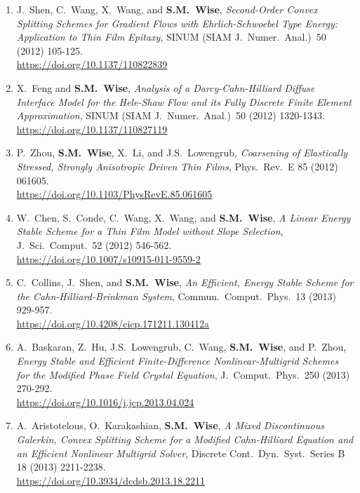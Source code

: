 \documentclass[10pt,letterpaper]{article}
\begin{document}
\begin{enumerate}
	\item
J.~Shen, C.~Wang, X.~Wang, and \textbf{S.M.~Wise}, {\sl Second-Order Convex Splitting Schemes for Gradient Flows with Ehrlich-Schwoebel Type Energy: Application to Thin Film Epitaxy}, SINUM (SIAM J.~Numer.~Anal.)~50 (2012) 105-125.
	\\
\url{https://doi.org/10.1137/110822839}
    
    \item
X.~Feng and \textbf{S.M.~Wise}, {\sl Analysis of a Darcy-Cahn-Hilliard Diffuse Interface Model for the Hele-Shaw Flow and its Fully Discrete Finite Element Approximation}, SINUM (SIAM J.~Numer.~Anal.)~50 (2012) 1320-1343.
	\\
\url{https://doi.org/10.1137/110827119}

    \item
P.~Zhou, \textbf{S.M.~Wise}, X.~Li, and J.S.~Lowengrub, {\sl Coarsening of Elastically Stressed, Strongly Anisotropic Driven Thin Films}, Phys.~Rev.~E 85 (2012) 061605.
	\\
\url{https://doi.org/10.1103/PhysRevE.85.061605}

	\item
W.~Chen, S.~Conde, C.~Wang, X.~Wang, and \textbf{S.M.~Wise}, {\sl A Linear Energy Stable Scheme for a Thin Film Model without Slope Selection}, J.~Sci.~Comput.~52 (2012) 546-562.
	\\
\url{https://doi.org/10.1007/s10915-011-9559-2}

    \item
C.~Collins, J.~Shen, and \textbf{S.M.~Wise}, {\sl An Efficient, Energy Stable Scheme for the Cahn-Hilliard-Brinkman System}, Commun.~Comput.~Phys.~13 (2013) 929-957.
	\\
\url{https://doi.org/10.4208/cicp.171211.130412a}

    \item
A.~Baskaran, Z.~Hu, J.S.~Lowengrub, C.~Wang, \textbf{S.M.~Wise}, and P.~Zhou, {\sl Energy Stable and Efficient Finite-Difference Nonlinear-Multigrid Schemes for the Modified Phase Field Crystal Equation}, J.~Comput.~Phys.~250 (2013) 270-292.
	\\
\url{https://doi.org/10.1016/j.jcp.2013.04.024}

	\item
A.~Aristotelous, O.~Karakashian, \textbf{S.M.~Wise}, {\sl A Mixed Discontinuous Galerkin, Convex Splitting Scheme for a Modified Cahn-Hilliard Equation and an Efficient Nonlinear Multigrid Solver}, Discrete Cont.~Dyn.~Syst.~Series B 18 (2013) 2211-2238.
	\\
\url{https://doi.org/10.3934/dcdsb.2013.18.2211}


\end{enumerate}
\end{document}
